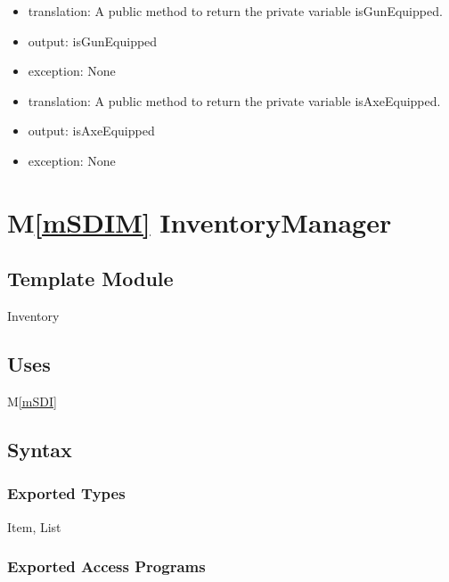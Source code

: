 \documentclass[12pt]{article}
\newcommand{\mref}[1]{M\ref{#1}}
\begin{document}
\begin{itemize}
\item {\color{magenta} translation: A public method to return the private variable isGunEquipped.}
\item {\color{magenta} output: isGunEquipped}
\item {\color{magenta} exception: None}
\end{itemize}

\begin{itemize}
\item {\color{magenta} translation: A public method to return the private variable isAxeEquipped.}
\item {\color{magenta} output: isAxeEquipped}
\item {\color{magenta} exception: None}
\end{itemize}

\newpage

\section* {\mref{mSDIM} InventoryManager}

\subsection*{Template Module}

Inventory

\subsection* {Uses}

\mref{mSDI}

\subsection* {Syntax}

\subsubsection* {Exported Types}

Item, List

\subsubsection* {Exported Access Programs}
\end{document}
